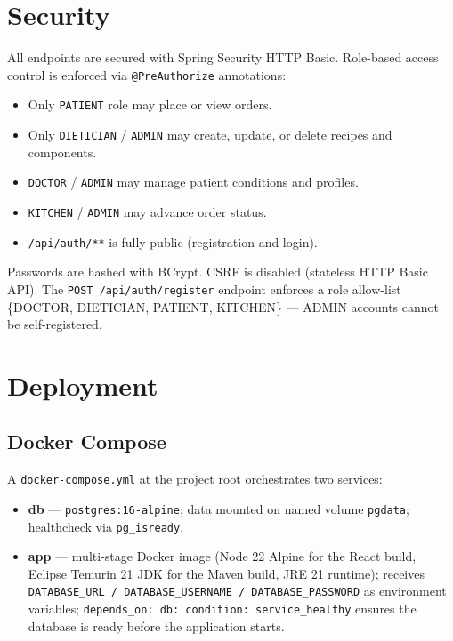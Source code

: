\documentclass[12pt,a4paper]{article}
\begin{document}
\section{Security}
All endpoints are secured with Spring Security HTTP Basic.
Role-based access control is enforced via \texttt{@PreAuthorize} annotations:
\begin{itemize}[noitemsep]
  \item Only \texttt{PATIENT} role may place or view orders.
  \item Only \texttt{DIETICIAN} / \texttt{ADMIN} may create, update, or delete
        recipes and components.
  \item \texttt{DOCTOR} / \texttt{ADMIN} may manage patient conditions and
        profiles.
  \item \texttt{KITCHEN} / \texttt{ADMIN} may advance order status.
  \item \texttt{/api/auth/**} is fully public (registration and login).
\end{itemize}
Passwords are hashed with BCrypt.  CSRF is disabled (stateless HTTP Basic API).
The \texttt{POST /api/auth/register} endpoint enforces a role allow-list
\{DOCTOR, DIETICIAN, PATIENT, KITCHEN\} — ADMIN accounts cannot be
self-registered.

\section{Deployment}

\subsection{Docker Compose}
A \texttt{docker-compose.yml} at the project root orchestrates two services:
\begin{itemize}[noitemsep]
  \item \textbf{db} — \texttt{postgres:16-alpine}; data mounted on named volume
        \texttt{pgdata}; healthcheck via \texttt{pg\_isready}.
  \item \textbf{app} — multi-stage Docker image (Node 22 Alpine for the React
        build, Eclipse Temurin 21 JDK for the Maven build, JRE 21 runtime);
        receives \texttt{DATABASE\_URL / DATABASE\_USERNAME / DATABASE\_PASSWORD}
        as environment variables; \texttt{depends\_on: db: condition: service\_healthy}
        ensures the database is ready before the application starts.
\end{itemize}
\end{document}
